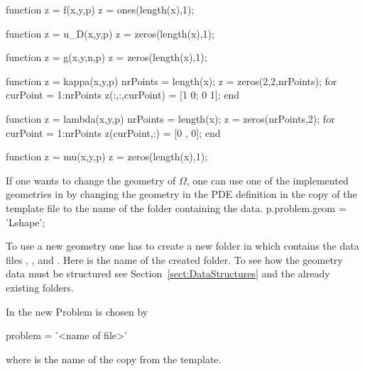 \begin{pcode}

function z = f(x,y,p)
z = ones(length(x),1);


function z = u_D(x,y,p)
z = zeros(length(x),1);

function z = g(x,y,n,p)
z = zeros(length(x),1);


function z = kappa(x,y,p)
nrPoints = length(x);
z = zeros(2,2,nrPoints);
for curPoint = 1:nrPoints
    z(:,:,curPoint) = [1 0;
                      0 1];
end

function z = lambda(x,y,p)
nrPoints = length(x);
z = zeros(nrPoints,2);
for curPoint = 1:nrPoints
    z(curPoint,:) = [0 , 0];
end


function z = mu(x,y,p)
z = zeros(length(x),1);

\end{pcode}

If one wants to change the geometry of $\Omega$, one can use one of the implemented geometries in  by changing the geometry in the PDE definition in the copy of the template file to the name of the folder containing the data.
p.problem.geom = 'Lshape';

To use a new geometry one has to create a new folder in  which contains the data files , ,  and . Here  is the name of the created folder. To see how the geometry data must be structured see Section~\ref{sect:DataStructures} and the already existing folders.

In  the new Problem is chosen by
\begin{pcode}
problem = '<name of file>'
\end{pcode}
where  is the name of the copy from the template.